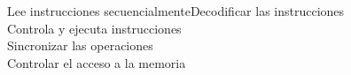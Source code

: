 \documentclass[preview]{standalone}
\begin{document}
Lee instrucciones secuencialmenteDecodificar las instrucciones\\Controla y ejecuta instrucciones\\Sincronizar las operaciones\\Controlar el acceso a la memoria\\
\end{document}
